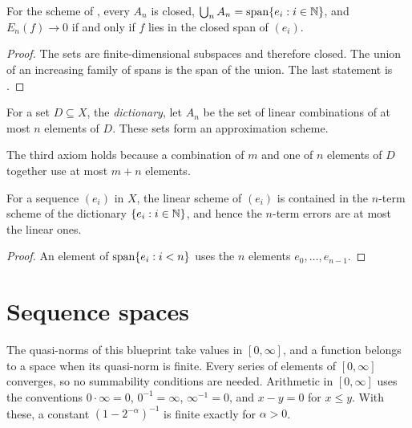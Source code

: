 \begin{lemma}
\label{lem:ofspan}
\leanok
{}
For the scheme of , every $A_n$ is closed, $\bigcup_n A_n = \operatorname{span}\{e_i : i
\in \mathbb{N}\}$, and $E_n(f) \to 0$ if and only if $f$ lies in the closed span of $(e_i)$.
\end{lemma}

\begin{proof}
\leanok
The sets are finite-dimensional subspaces and therefore closed. The union of an increasing
family of spans is the span of the union. The last statement is .
\end{proof}

\begin{definition}
\label{def:nterm}
\leanok
{}
For a set $D \subseteq X$, the \emph{dictionary}, let $A_n$ be the set of linear combinations
of at most $n$ elements of $D$. These sets form an approximation scheme.
\end{definition}

The third axiom holds because a combination of $m$ and one of $n$ elements of $D$ together
use at most $m + n$ elements.

\begin{lemma}
\label{lem:nterm-ofspan}
\leanok
{}
For a sequence $(e_i)$ in $X$, the linear scheme of $(e_i)$ is contained in the $n$-term
scheme of the dictionary $\{e_i : i \in \mathbb{N}\}$, and hence the $n$-term errors are at most the
linear ones.
\end{lemma}

\begin{proof}
\leanok
An element of $\operatorname{span}\{e_i : i < n\}$ uses the $n$ elements $e_0, \dots, e_{n-1}$.
\end{proof}

\chapter{Sequence spaces}
\label{ch:sequences}

The quasi-norms of this blueprint take values in $[0, \infty]$, and a function belongs to a
space when its quasi-norm is finite. Every series of elements of $[0, \infty]$ converges, so
no summability conditions are needed. Arithmetic in $[0, \infty]$ uses the conventions
$0 \cdot \infty = 0$, $0^{-1} = \infty$, $\infty^{-1} = 0$, and $x - y = 0$ for $x \leq y$.
With these, a constant $(1 - 2^{-\alpha})^{-1}$ is finite exactly for $\alpha > 0$.

